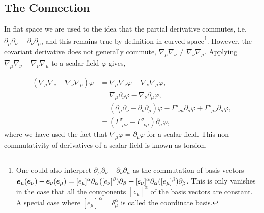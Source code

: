\subsection{The Connection}\label{intro:sec:levicivita}

In flat space we are used to the idea that the partial derivative commutes, i.e.
$\partial_\mu \partial_\nu = \partial_\nu \partial_\mu$, and this remains true
by definition in curved space\footnote{
One could also interpret $\partial_\mu \partial_\nu- \partial_\nu\partial_\mu$ as
the commutation of basis vectors $\boldsymbol{e}_\mu(\boldsymbol{e}_\nu)-\boldsymbol{e}_\nu(\boldsymbol{e}_\mu) =
[e_\mu]^\alpha \partial_\alpha ([e_\nu]^\beta)\partial_\beta -
[e_\nu]^\alpha \partial_\alpha ([e_\mu]^\beta)\partial_\beta$. This is only vanishes
in the case that all the components $[e_\mu]^\alpha$ of the basis vectors are
constant. A special case where $[e_\mu]^\alpha = \delta^\alpha_\mu$ is called the coordinate basis.
}.
However, the covariant derivative does not generally
commute, $\nabla_\mu \nabla_\nu \neq \nabla_\nu \nabla_\mu$. Applying
$\nabla_\mu \nabla_\nu - \nabla_\nu \nabla_\mu$ to a scalar field $\varphi$ gives,

\begin{align}
(\nabla_\mu \nabla_\nu  - \nabla_\nu \nabla_\mu )\varphi &= \nabla_\mu \nabla_\nu \varphi - \nabla_\nu \nabla_\mu \varphi , \\
                                               &= \nabla_\mu \partial_\nu \varphi - \nabla_\nu \partial_\mu \varphi , \\
                                               &= (\partial_\mu \partial_\nu  - \partial_\nu \partial_\mu )\varphi -  \Gamma^{\sigma}_{\,\,\,\nu\mu} \partial_\sigma \varphi + \Gamma^{\sigma}_{\,\,\,\mu\nu} \partial_\sigma \varphi,\\
                                               &=(\Gamma^{\sigma}_{\,\,\,\mu\nu}  - \Gamma^{\sigma}_{\,\,\,\nu\mu}) \partial_\sigma \varphi,
\end{align}
where we have used the fact that $\nabla_\mu \varphi = \partial_\mu \varphi$ for a scalar field. This non-commutativity of derivatives of a scalar field is known as torsion.

